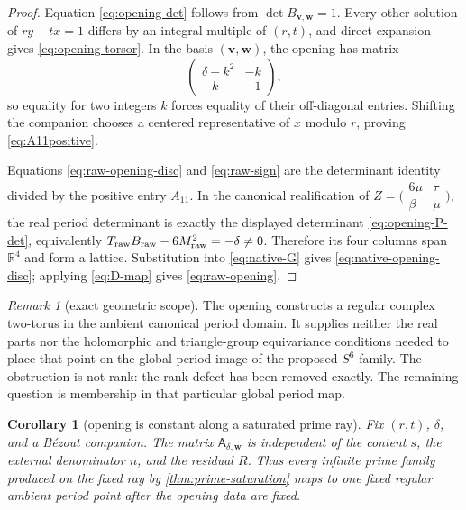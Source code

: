 \documentclass[11pt]{article}
\newtheorem{corollary}[theorem]{Corollary}
\theoremstyle{definition}
\theoremstyle{remark}
\newtheorem{remark}[theorem]{Remark}
\newcommand{\R}{\mathbb R}
\newcommand{\1}{\mathbf 1}
\begin{document}
\begin{proof}
Equation \eqref{eq:opening-det} follows from
$\det B_{\mathbf v,\mathbf w}=1$.  Every other solution of
$ry-tx=1$ differs by an integral multiple of $(r,t)$, and direct expansion
gives \eqref{eq:opening-torsor}.  In the basis $(\mathbf v,\mathbf w)$, the
opening has matrix
\[
 \begin{pmatrix}\delta-k^2&-k\\-k&-1\end{pmatrix},
\]
so equality for two integers $k$ forces equality of their off-diagonal
entries.  Shifting the companion chooses a centered representative of $x$
modulo $r$, proving \eqref{eq:A11positive}.

Equations \eqref{eq:raw-opening-disc} and \eqref{eq:raw-sign} are the
determinant identity divided by the positive entry $A_{11}$.  In the
canonical realification of
$Z=\bigl(\begin{smallmatrix}6\mu&\tau\\\beta&\mu\end{smallmatrix}\bigr)$,
the real period determinant is exactly the displayed determinant
\eqref{eq:opening-P-det}, equivalently
$T_{\rm raw}B_{\rm raw}-6M_{\rm raw}^2=-\delta\ne0$.  Therefore its four
columns span $\R^4$ and form a lattice.  Substitution into
\eqref{eq:native-G} gives \eqref{eq:native-opening-disc}; applying
\eqref{eq:D-map} gives \eqref{eq:raw-opening}.
\end{proof}

\begin{remark}[exact geometric scope]
The opening constructs a regular complex two-torus in the ambient canonical
period domain.  It supplies neither the real parts nor the holomorphic and
triangle-group equivariance conditions needed to place that point on the
global period image of the proposed $S^6$ family.  The obstruction is not
rank: the rank defect has been removed exactly.  The remaining question is
membership in that particular global period map.
\end{remark}

\begin{corollary}[opening is constant along a saturated prime ray]
Fix $(r,t)$, $\delta$, and a Bézout companion.  The matrix
$\mathsf A_{\delta,\mathbf w}$ is independent of the content $s$, the
external denominator $n$, and the residual $R$.  Thus every infinite prime
family produced on the fixed ray by \cref{thm:prime-saturation} maps to one
fixed regular ambient period point after the opening data are fixed.
\end{corollary}
\end{document}
